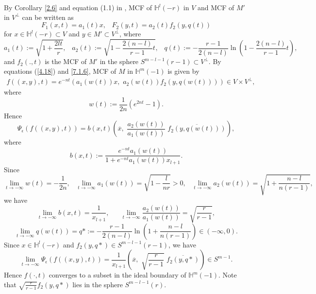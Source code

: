 \documentclass[12pt]{article}
\begin{document}
By Corollary \ref{2.6} and equation (1.1) in \cite{X.C}, MCF of $\mathbb{H}^l(-r)$ in $V$
and MCF of $M'$ in $V^\perp$ can be written as
\[ F_1(x,t)=a_1(t) x, \hspace{10pt} F_2(y,t)= a_2(t) f_2(y,q(t)) \]
for $x \in \mathbb{H}^l(-r) \subset V$ and $y \in M' \subset V^\perp$,
 where
\[ a_1 (t) := \sqrt{1+\frac{2lt}{r}}, \hspace{10pt}
 a_2 (t) := \sqrt{1-\frac{2(n-l)}{r-1}t},  \hspace{10pt}
 q(t):=-\frac{r-1}{2(n-l)}\ln \left( 1-\frac{2(n-l)}{r-1}t \right),
\]
and $f_2(.,t)$ is the MCF of $M'$ in the sphere $S^{m-l-1}(r-1) \subset V^\perp$.
By equations (\ref{4.18}) and \eqref{7.1.6}, MCF of $M$ in $\mathbb{H}^m(-1)$ is given by
\begin{align*}
	f((x,y),t)=e^{-nt}(a_1(w(t)) x, \,\, a_2(w(t)) f_2(y,q(w(t)))) \in V \times V^\perp,
\end{align*}
where
\[ w(t) := \frac{1}{2n}(e^{2nt}-1).\]
Hence
\[ \Psi_\epsilon (f((x,y),t))
   = b(x, t) \left( \overline{x}, \,\, \frac{a_2(w(t))}{a_1(w(t))} \,\, \overline{f_2(y,q(w(t)))} \right) ,\]
where
\[ b(x, t):= \frac{e^{-nt} a_1(w(t))}{1+ e^{-nt} a_1(w(t)) x_{l+1}}. \]
Since
\[ \lim_{t \rightarrow -\infty} w(t) = -\frac{1}{2n}, \hspace{10pt}
\lim_{t \rightarrow -\infty} a_1(w(t)) = \sqrt{1 - \frac{l}{nr}} > 0, \hspace{10pt}
\lim_{t \rightarrow -\infty} a_2(w(t)) =  \sqrt{1+\frac{n-l}{n(r-1)}},
\]
we have
\[ \lim_{t \rightarrow -\infty} b(x, t) = \frac{1}{x_{l+1}}, \hspace{20pt}
\lim_{t \rightarrow -\infty} \frac{a_2(w(t))}{a_1(w(t))} = \sqrt{\frac{r}{r-1}}, \]
\[ \lim_{t \rightarrow -\infty} q(w(t)) = q* := -\frac{r-1}{2(n-l)}\ln \left( 1+\frac{n-l}{n(r-1)} \right) \in (-\infty, 0).
\]
Since $x \in \mathbb{H}^l(-r)$ and $f_2(y,q*) \in S^{m-l-1}(r-1)$, we have
\begin{equation} \label{eqn:limitPsif}
 \lim_{t \rightarrow -\infty}  \Psi_\epsilon (f((x,y),t))
= \frac{1}{x_{l+1}} \left( \overline{x}, \,\,  \sqrt{\frac{r}{r-1}} \,\, \overline{f_2(y,q*)} \right) \in S^{m-1}.
\end{equation}
Hence $f(\cdot, t)$ converges to a subset in the ideal boundary of $\mathbb{H}^{m}(-1)$.
Note that
$\sqrt{\frac{r}{r-1}} f_2(y,q*)$ lies in the sphere $S^{m-l-1}(r)$.
\end{document}
